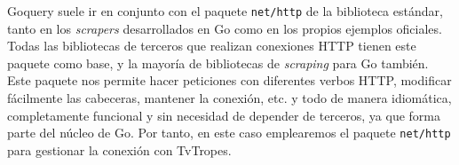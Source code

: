 Goquery suele ir en conjunto con el paquete \texttt{net/http} de la biblioteca
estándar, tanto en los \textit{scrapers} desarrollados en Go como en los propios
ejemplos oficiales. Todas las bibliotecas de terceros que realizan conexiones
HTTP tienen este paquete como base, y la mayoría de bibliotecas de
\textit{scraping} para Go también. Este paquete nos permite hacer peticiones con
diferentes verbos HTTP, modificar fácilmente las cabeceras, mantener la
conexión, etc. y todo de manera idiomática, completamente funcional y sin
necesidad de depender de terceros, ya que forma parte del núcleo de Go. Por
tanto, en este caso emplearemos el paquete \texttt{net/http} para gestionar la
conexión con TvTropes. 